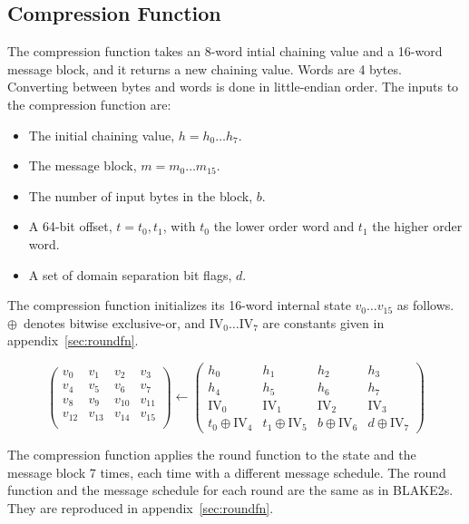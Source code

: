 \documentclass[11pt,notitlepage,a4paper]{article}
\newcommand{\IV}{\text{IV}}
\begin{document}
\subsection{Compression Function}\label{sec:compression}

The compression function takes an 8-word intial chaining value and a 16-word
message block, and it returns a new chaining value. Words are 4 bytes.
Converting between bytes and words is done in little-endian order. The inputs
to the compression function are:

\begin{itemize}
    \item The initial chaining value, $h = h_{0} \ldots h_{7}$.
    \item The message block, $m = m_{0} \ldots m_{15}$.
    \item The number of input bytes in the block, $b$.
    \item A 64-bit offset, $t=t_{0},t_{1}$, with $t_{0}$ the lower order word
        and $t_{1}$ the higher order word.
    \item A set of domain separation bit flags, $d$.
\end{itemize}

The compression function initializes its 16-word internal state $v_{0} \ldots
v_{15}$ as follows. $\oplus$~denotes bitwise exclusive-or, and $\IV_{0} \ldots
\IV_{7}$ are constants given in appendix~\ref{sec:roundfn}.

\begin{equation*}
\begin{pmatrix}
v_{0} & v_{1} & v_{2} & v_{3} \\
v_{4} & v_{5} & v_{6} & v_{7} \\
v_{8} & v_{9} & v_{10} & v_{11} \\
v_{12} & v_{13} & v_{14} & v_{15} \\
\end{pmatrix}
\leftarrow
\begin{pmatrix}
h_{0} & h_{1} & h_{2} & h_{3} \\
h_{4} & h_{5} & h_{6} & h_{7} \\
\IV_{0} & \IV_{1} & \IV_{2} & \IV_{3} \\
t_{0} \oplus \IV_{4} & t_{1} \oplus \IV_{5} & b \oplus \IV_{6} & d \oplus \IV_{7}
\end{pmatrix}
\end{equation*}

The compression function applies the round function to the state and the
message block 7 times, each time with a different message schedule. The round
function and the message schedule for each round are the same as in BLAKE2s.
They are reproduced in appendix~\ref{sec:roundfn}.
\end{document}
